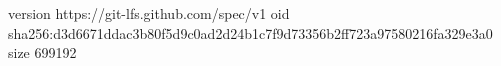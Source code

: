 version https://git-lfs.github.com/spec/v1
oid sha256:d3d6671ddac3b80f5d9c0ad2d24b1c7f9d73356b2ff723a97580216fa329e3a0
size 699192
